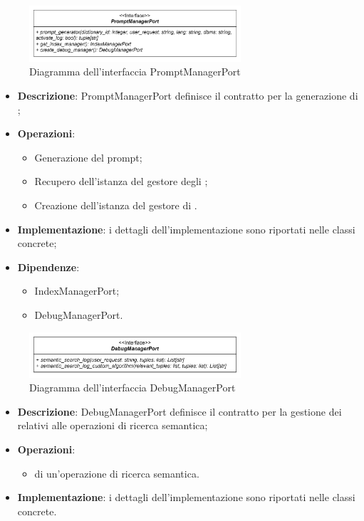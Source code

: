  \label{PromptManagerPort}
\begin{figure}[H]
    \centering
    \includegraphics[width=0.7\textwidth]{assets/Backend/prompt_manager_port.png}
    \caption{Diagramma dell'interfaccia PromptManagerPort}
  \end{figure}
\begin{itemize}
    \item \textbf{Descrizione}: PromptManagerPort definisce il contratto per la generazione di ;
    \item \textbf{Operazioni}:
    \begin{itemize}
      \item Generazione del prompt;
      \item Recupero dell'istanza del gestore degli ;
      \item Creazione dell'istanza del gestore di .
    \end{itemize}
    \item \textbf{Implementazione}: i dettagli dell'implementazione sono riportati nelle classi concrete;
    \item \textbf{Dipendenze}:
    \begin{itemize}
        \item IndexManagerPort;
        \item DebugManagerPort.
    \end{itemize}
\end{itemize} 

 \label{DebugManagerPort}
\begin{figure}[H]
    \centering
    \includegraphics[width=0.7\textwidth]{assets/Backend/debug_manager_port.png}
    \caption{Diagramma dell'interfaccia DebugManagerPort}
  \end{figure}
\begin{itemize}
    \item \textbf{Descrizione}: DebugManagerPort definisce il contratto per la gestione dei  relativi alle operazioni di ricerca semantica;
    \item \textbf{Operazioni}:
    \begin{itemize}
      \item {} di un'operazione di ricerca semantica.
    \end{itemize}
    \item \textbf{Implementazione}: i dettagli dell'implementazione sono riportati nelle classi concrete.
\end{itemize}  

